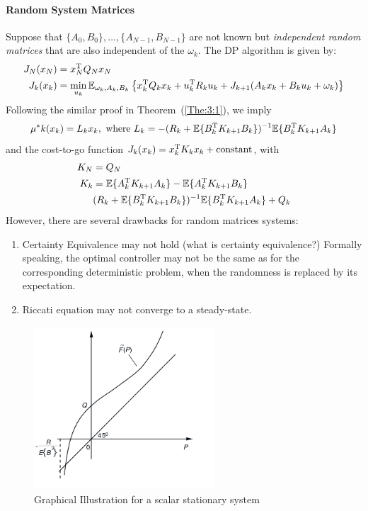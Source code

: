 \paragraph{Random System Matrices}
Suppose that $\{A_0,B_0\},\dots,\{A_{N-1},B_{N-1}\}$ are not known but \emph{independent random matrices} that are also independent of the $\omega_k$. The DP algorithm is given by:
\begin{align*}
J_N(x_N)&=x_N^{\mathrm T} Q_Nx_N\\
J_k(x_k)&=\min_{u_k}\mathbb{E}_{\omega_k,A_k,B_k}
\left\{
x_k^{\mathrm T} Q_kx_k
+
u_k^{\mathrm T} R_ku_k
+
J_{k+1}(A_kx_k+B_ku_k+\omega_k)
\right\}
\end{align*}
Following the similar proof in Theorem~(\ref{The:3:1}), we imply
\[
\mu^*k(x_k) = L_kx_k,\ \text{where }
L_k
=-(R_k + \mathbb{E}\{B_k^{\mathrm T} K_{k+1}B_k\})^{-1}\mathbb{E}\{B_k^{\mathrm T} K_{k+1}A_k\}
\]
and the cost-to-go function $J_k(x_k) = x_k^{\mathrm T} K_kx_k+\text{constant}$, with
\begin{align*}
K_N&=Q_N\\
K_k&=\mathbb{E}\{A_k^{\mathrm T} K_{k+1}A_k\} - \mathbb{E}\{A_k^{\mathrm T} K_{k+1}B_k\}\\&(R_k + \mathbb{E}\{B_k^{\mathrm T} K_{k+1}B_k\})^{-1}\mathbb{E}\{B_k^{\mathrm T} K_{k+1}A_k\}+Q_k
\end{align*}
However, there are several drawbacks for random matrices systems:
\begin{enumerate}
\item
Certainty Equivalence may not hold (what is certainty equivalence?)
Formally speaking, the optimal controller may not be the same as for the corresponding deterministic problem, when the randomness is replaced by its expectation.
\item
Riccati equation may not converge to a steady-state.
\end{enumerate}
\begin{figure}
\centering
\includegraphics[width=0.6\textwidth]{Forth_lecture/p_7}
\caption{Graphical Illustration for a scalar stationary system}
\label{fig:3:2}
\end{figure}

